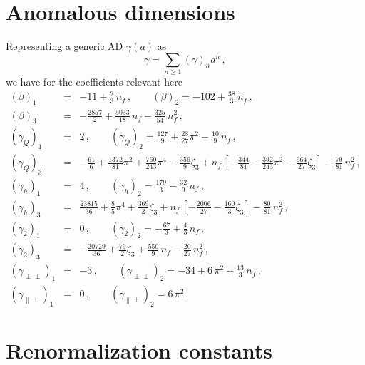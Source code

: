 \documentclass[12pt]{article}
\numberwithin{equation}{section}
\newcommand{\1}[1]{\mathbf{1}^{#1}}
\newcommand{\2}[1]{\mathbf{2}^{#1}}
\newcommand{\3}[1]{\mathbf{3}^{#1}}
\newcommand{\4}[1]{\mathbf{4}^{#1}}
\newcommand{\5}[1]{\mathbf{5}^{#1}}
\newcommand{\EQN}[1]{\hspace{3mm}\fbox{\fbox{$#1$}} \label{#1}}
\newcommand{\mlabel}[1]{ \text{\footnotesize \hspace{3mm}\fbox{\fbox{$#1$}} \label{#1}}}
\renewcommand{\EQN}[1]{\mlabel{#1}}
\renewcommand{\mlabel}[1]{\label{#1}}
\renewcommand{\EQN}[1]{\label{#1}}
\newcommand{\beq}{\begin{equation}}
\newcommand{\eeq}{\end{equation}}
\newcommand{\ga}{\gamma}
\begin{document}
\section{Anomalous dimensions}
\label{app:a}
Representing a generic AD $\ga(a) $ as
\beq
\ga = \sum_{n \ge 1}
\left(\ga\right)_n a^n
\,,
\eeq
we have for the coefficients relevant here 
\begin{eqnarray}
(\beta)_1&=&
  -11+\frac{2}{3}\, n_f\,,
 \qquad
(\beta)_2=
  -102+\frac{38}{3}\, n_f\,,
\nonumber\\
 (\beta)_3&=&
-\frac{2857}{2} 
+\frac{5033}{18}\, n_f
-\frac{325}{54}\, n_f^2
\,, %
\nonumber\\
(\ga_Q)_1&=&
2\,, 
\qquad
(\ga_Q)_2=
\frac{127}{9}+\frac{28}{27} \pi^2-\frac{10}{9}\, n_f
\,, %
\nonumber\\
(\ga_Q)_3&=&
-\frac{61}{6}+\frac{1372}{81} \pi^2+\frac{760}{243} \pi^4-\frac{356}{9}  \zeta_{3}
+n_f\, \left[-\frac{344}{81}-\frac{392}{243} \pi^2-\frac{664}{27}  \zeta_{3}\right]
-\frac{70}{81}\, n_f^2
\,, %
\nonumber
\\
(\ga_h)_1&=&
4\,, 
\qquad
(\ga_h)_2=
\frac{179}{3}-\frac{32}{9}\, n_f
\,, %
\nonumber\\
(\ga_h)_3&=&
\frac{23815}{36}+\frac{8}{5} \pi^4+\frac{369}{2}  \zeta_{3}
+n_f\, \left[-\frac{2006}{27}-\frac{160}{3}  \zeta_{3}\right]
-\frac{80}{81}\, n_f^2
\,, %
\nonumber\\
(\ga_2)_1&=&0
\,, 
\qquad
(\ga_2)_2=
-\frac{67}{3}+\frac{4}{3}\, n_f
\,, %
\nonumber\\
(\ga_2)_3&=&
-\frac{20729}{36}+\frac{79}{2}  \zeta_{3} 
+\frac{550}{9}\, n_f
-\frac{20}{27}\, n_f^2
\,, 
\nonumber\\
(\ga_{\perp\perp})_1 &=& -3
\,,
\qquad
(\ga_{\perp\perp})_2 = -34 +6\, \pi^2 +\frac{13}{3}\, n_f
\,,
\nonumber\\
(\ga_{\parallel\perp})_1 &=& 0
\,,
\qquad
(\ga_{\parallel\perp})_2 =  6\, \pi^2 
\,.
\end{eqnarray} 

\section{Renormalization constants}
\label{app:b}
\end{document}
